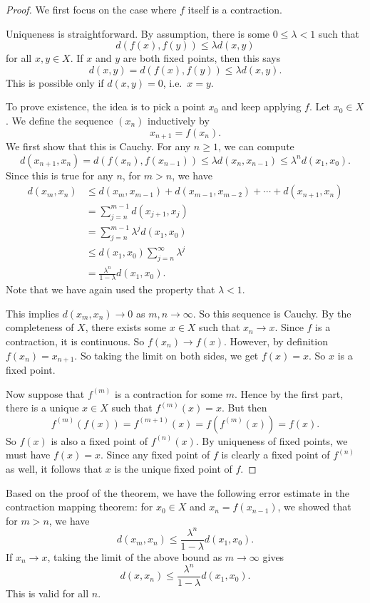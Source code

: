 \documentclass[a4paper]{article}
\begin{document}
\begin{proof}
  We first focus on the case where $f$ itself is a contraction.

  Uniqueness is straightforward. By assumption, there is some $0 \leq \lambda < 1$ such that
  \[
     d(f(x), f(y)) \leq \lambda d(x, y)
  \]
  for all $x, y \in X$. If $x$ and $y$ are both fixed points, then this says
  \[
    d(x, y) = d(f(x), f(y)) \leq \lambda d(x, y).
  \]
  This is possible only if $d(x, y) = 0$, i.e.\ $x = y$.

  To prove existence, the idea is to pick a point $x_0$ and keep applying $f$. Let $x_0 \in X$. We define the sequence $(x_n)$ inductively by
  \[
    x_{n + 1} = f(x_n).
  \]
  We first show that this is Cauchy. For any $n \geq 1$, we can compute
  \[
    d(x_{n + 1}, x_n) = d(f(x_n), f(x_{n - 1})) \leq \lambda d(x_n, x_{n - 1}) \leq \lambda^n d(x_1, x_0).
  \]
  Since this is true for any $n$, for $m > n$, we have
  \begin{align*}
    d(x_m, x_n) &\leq d(x_m, x_{m - 1}) + d(x_{m - 1}, x_{m - 2}) + \cdots + d(x_{n + 1}, x_n) \\
    &= \sum_{j = n}^{m - 1} d(x_{j + 1}, x_j)\\
    &= \sum_{j = n}^{m - 1} \lambda^j d(x_1, x_0)\\
    &\leq d(x_1, x_0) \sum_{j = n}^\infty \lambda^j\\
    &= \frac{\lambda^n}{1 - \lambda} d(x_1, x_0).
  \end{align*}
  Note that we have again used the property that $\lambda < 1$.

  This implies $d(x_m, x_n) \to 0$ as $m, n \to \infty$. So this sequence is Cauchy. By the completeness of $X$, there exists some $x \in X$ such that $x_n \to x$. Since $f$ is a contraction, it is continuous. So $f(x_n) \to f(x)$. However, by definition $f(x_n) = x_{n + 1}$. So taking the limit on both sides, we get $f(x) = x$. So $x$ is a fixed point.

  Now suppose that $f^{(m)}$ is a contraction for some $m$. Hence by the first part, there is a unique $x \in X$ such that $f^{(m)}(x) = x$. But then
  \[
    f^{(m)}(f(x)) = f^{(m + 1)}(x) = f(f^{(m)}(x)) = f(x).
  \]
  So $f(x)$ is also a fixed point of $f^{(n)}(x)$. By uniqueness of fixed points, we must have $f(x) = x$. Since any fixed point of $f$ is clearly a fixed point of $f^{(n)}$ as well, it follows that $x$ is the unique fixed point of $f$.
\end{proof}

Based on the proof of the theorem, we have the following error estimate in the contraction mapping theorem: for $x_0 \in X$ and $x_n = f(x_{n - 1})$, we showed that for $m > n$, we have
\[
  d(x_m, x_n) \leq \frac{\lambda^n}{1 - \lambda}d(x_1, x_0).
\]
If $x_n \to x$, taking the limit of the above bound as $m \to \infty$ gives
\[
  d(x, x_n) \leq \frac{\lambda^n}{1 - \lambda} d(x_1, x_0).
\]
This is valid for all $n$.
\end{document}
